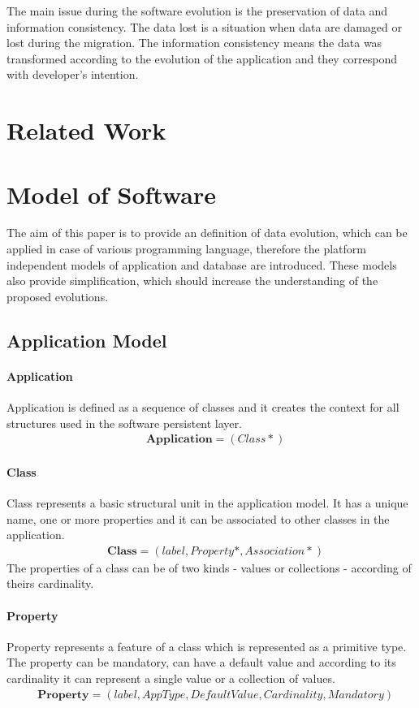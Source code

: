 \documentclass[11pt]{article}
\begin{document}
The main issue during the software evolution is the preservation of data and information consistency. The data lost is a situation when data are damaged or lost during the migration. The information consistency means the data was transformed according to the evolution of the application and they correspond with developer's intention. 


\section{Related Work}
\label{sec:related-work}

\section{Model of Software}
\label{sec:models}
The aim of this paper is to provide an definition of data evolution, which can be applied in case of various programming language, therefore the platform independent models of application and database are introduced. These models also provide simplification, which should increase the understanding of the proposed evolutions.

\subsection{Application Model}
\paragraph{Application} Application is defined as a sequence of classes and it creates the context for all structures used in the software persistent layer.
\begin{align*}
& \mathbf{Application} = (Class*)
\end{align*}

\paragraph{Class} Class represents a basic structural unit in the application model. It has a unique name, one or more properties and it can be associated to other classes in the application. 
\begin{align*}
& 	\mathbf{Class} = (label, Property*, Association*)
\end{align*}
The properties of a class can be of two kinds - values or collections - according of theirs cardinality.
	 
\paragraph{Property} Property represents a feature of a class which is represented as a primitive type. The property can be mandatory, can have a default value and according to its cardinality it can represent a single value or a collection of values. 
\begin{align*}
&	\mathbf{Property} = (label, AppType, DefaultValue, Cardinality, Mandatory)
\end{align*}
\end{document}
